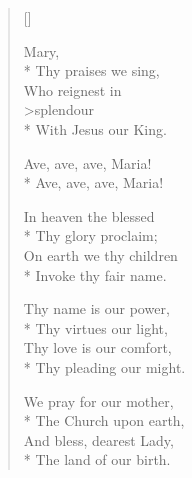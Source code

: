 \newHymn


\begin{multicols}{2}
\begin{verse}[\versewidth]

 Mary,\\*
Thy praises we sing,\\
Who reignest in \\>splendour\\*
With Jesus our King.




\begin{indentedVerse}
\vin Ave, ave, ave, Maria!\\*
\vin	Ave, ave, ave, Maria!
\end{indentedVerse}

 In heaven the blessed\\*
Thy glory proclaim;\\
On earth we thy children\\*
Invoke thy fair name.

 Thy name is our power,\\*
Thy virtues our light,\\
Thy love is our comfort,\\*
Thy pleading our might.

 We pray for our mother,\\*
The Church upon earth,\\
And bless, dearest Lady,\\*
The land of our birth.


\end{verse}
\end{multicols}
